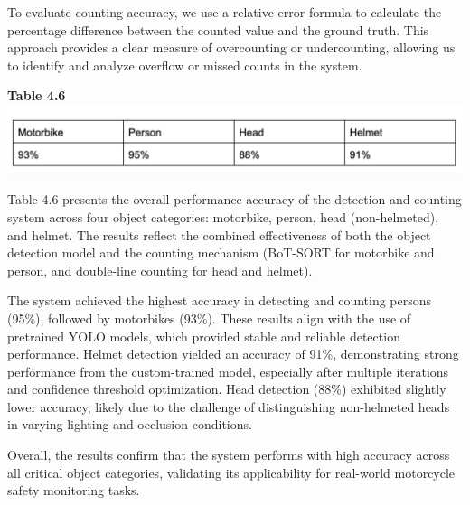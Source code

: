 \vspace{1em}
\noindent\hspace{2.5em}To evaluate counting accuracy, we use a relative error formula to calculate the percentage difference between the counted value and the ground truth. This approach provides a clear measure of overcounting or undercounting, allowing us to identify and analyze overflow or missed counts in the system.


\vspace{0.5em}
\noindent\textbf{Table 4.6} \\
\includegraphics[width=1\textwidth]{conclude_percent.png}

\noindent\hspace{2.5em}Table 4.6 presents the overall performance accuracy of the detection and counting system across four object categories: motorbike, person, head (non-helmeted), and helmet. The results reflect the combined effectiveness of both the object detection model and the counting mechanism (BoT-SORT for motorbike and person, and double-line counting for head and helmet).

The system achieved the highest accuracy in detecting and counting persons (95\%), followed by motorbikes (93\%). These results align with the use of pretrained YOLO models, which provided stable and reliable detection performance. Helmet detection yielded an accuracy of 91\%, demonstrating strong performance from the custom-trained model, especially after multiple iterations and confidence threshold optimization. Head detection (88\%) exhibited slightly lower accuracy, likely due to the challenge of distinguishing non-helmeted heads in varying lighting and occlusion conditions.

Overall, the results confirm that the system performs with high accuracy across all critical object categories, validating its applicability for real-world motorcycle safety monitoring tasks.





